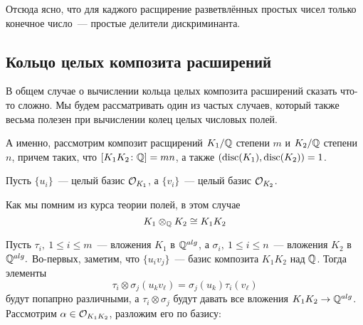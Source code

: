 	 Отсюда ясно, что для каджого расщирение разветвлённых простых чисел только конечное число~--- простые делители дискриминанта. 

	 \subsection{Кольцо целых композита расширений}

	 В общем случае о вычислении кольца целых композита расширений сказать что-то сложно. Мы будем рассматривать один из частых  случаев, который также весьма полезен при вычислении колец целых числовых полей. 

	 А именно, рассмотрим композит расщирений $K_1/\mathbb{Q}$ степени $m$ и $K_2/\mathbb{Q}$ степени $n$, причем таких, что $[K_1 K_2 \colon \mathbb{Q}] = mn$, а также $(\operatorname{disc}(K_1), \operatorname{disc}(K_2)) = 1$. 

	 Пусть $\{u_i \}$~--- целый базис $\mathcal{O}_{K_1}$, а $\{ v_i \}$~--- целый базис $\mathcal{O}_{K_2}$.

	 \begin{center}
	\end{center}

	Как мы помним из курса теории полей, в этом случае 
	\[
		K_1 \otimes_{\mathbb{Q}} K_2 \cong K_1 K_2
	\]

	Пусть $\tau_i, \ 1 \le i \le m$~--- вложения $K_1$  в $\mathbb{Q}^{alg}$, а $\sigma_i, \ 1 \le i \le n$~--- вложения $K_2$ в $\mathbb{Q}^{alg}. $ Во-первых, заметим, что $\{ u_i v_{j} \}$~--- базис композита $K_1 K_2$ над $\mathbb{Q}$. Тогда элементы 
	\[
		\tau_i \otimes \sigma_j  (u_k v_{\ell}) = \sigma_j(u_k) \tau_i(v_{\ell})
	\]
	будут попапрно различными, а $\tau_i \otimes \sigma_j$ будут давать все вложения $K_1 K_2 \to \mathbb{Q}^{alg}$. Рассмотрим $\alpha \in \mathcal{O}_{K_1 K_2}$, разложим его по базису:

